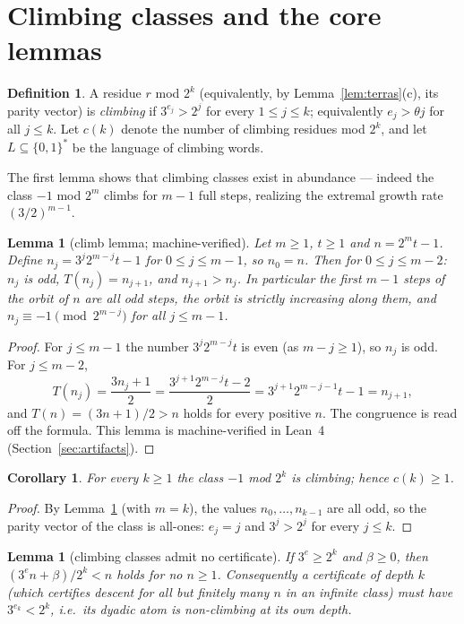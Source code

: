 \documentclass[11pt]{article}
\newtheorem{lemma}[theorem]{Lemma}
\newtheorem{corollary}[theorem]{Corollary}
\theoremstyle{definition}
\newtheorem{definition}[theorem]{Definition}
\begin{document}
\section{Climbing classes and the core lemmas}\label{sec:climb}

\begin{definition}\label{def:climbing}
A residue $r$ mod $2^k$ (equivalently, by Lemma~\ref{lem:terras}(c), its
parity vector) is \emph{climbing} if $3^{e_j}>2^j$ for every
$1\le j\le k$; equivalently $e_j>\theta j$ for all $j\le k$. Let $c(k)$
denote the number of climbing residues mod $2^k$, and let
$L\subseteq\{0,1\}^*$ be the language of climbing words.
\end{definition}

The first lemma shows that climbing classes exist in abundance --- indeed
the class $-1$ mod $2^m$ climbs for $m-1$ full steps, realizing the
extremal growth rate $(3/2)^{m-1}$.

\begin{lemma}[climb lemma; machine-verified]\label{lem:climb}
Let $m\ge 1$, $t\ge 1$ and $n=2^m t-1$. Define $n_j=3^j 2^{m-j}t-1$ for
$0\le j\le m-1$, so $n_0=n$. Then for $0\le j\le m-2$: $n_j$ is odd,
$T(n_j)=n_{j+1}$, and $n_{j+1}>n_j$. In particular the first $m-1$ steps of
the orbit of $n$ are all odd steps, the orbit is strictly increasing along
them, and $n_j\equiv -1 \pmod{2^{m-j}}$ for all $j\le m-1$.
\end{lemma}

\begin{proof}
For $j\le m-1$ the number $3^j2^{m-j}t$ is even (as $m-j\ge 1$), so $n_j$
is odd. For $j\le m-2$,
\[
T(n_j)=\frac{3n_j+1}{2}=\frac{3^{j+1}2^{m-j}t-2}{2}=3^{j+1}2^{m-j-1}t-1=n_{j+1},
\]
and $T(n)=(3n+1)/2>n$ holds for every positive $n$. The congruence is read
off the formula. This lemma is machine-verified in Lean~4
(Section~\ref{sec:artifacts}).
\end{proof}

\begin{corollary}\label{cor:cknonzero}
For every $k\ge 1$ the class $-1$ mod $2^k$ is climbing; hence $c(k)\ge 1$.
\end{corollary}

\begin{proof}
By Lemma~\ref{lem:climb} (with $m=k$), the values $n_0,\dots,n_{k-1}$ are
all odd, so the parity vector of the class is all-ones: $e_j=j$ and
$3^j>2^j$ for every $j\le k$.
\end{proof}

\begin{lemma}[climbing classes admit no certificate]\label{lem:nocert}
If $3^e\ge 2^k$ and $\beta\ge 0$, then $(3^e n+\beta)/2^k<n$ holds for no
$n\ge 1$. Consequently a certificate of depth $k$ (which certifies descent
for all but finitely many $n$ in an infinite class) must have $3^{e_k}<2^k$,
i.e.\ its dyadic atom is non-climbing at its own depth.
\end{lemma}
\end{document}
